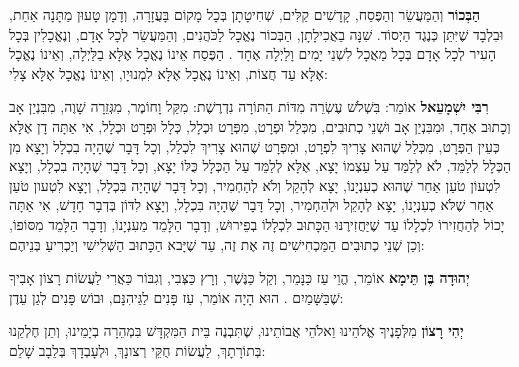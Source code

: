 \textbf{הַבְּכוֹר} וְהַמַּעֲשֵׂר וְהַפֶּסַח, קָדָשִׁים קַלִּים, שְׁחִיטָתָן בְּכָל מָקוֹם בָּעֲזָרָה, וְדָמָן טָעוּן מַתָּנָה אַחַת, וּבִלְבָד שֶׁיִּתֵּן כְּנֶגֶד הַיְסוֹד. שִׁנָּה בַאֲכִילָתָן, הַבְּכוֹר נֶאֱכָל לַכֹּהֲנִים, וְהַמַּעֲשֵׂר לְכָל אָדָם, וְנֶאֱכָלִין בְּכָל הָעִיר לְכָל אָדָם בְּכָל מַאֲכָל לִשְׁנֵי יָמִים וָלַיְלָה אֶחָד . הַפֶּסַח אֵינוֹ נֶאֱכָל אֶלָּא בַלַּיְלָה, וְאֵינוֹ נֶאֱכָל אֶלָּא עַד חֲצוֹת, וְאֵינוֹ נֶאֱכָל אֶלָּא לִמְנוּיָו, וְאֵינוֹ נֶאֱכָל אֶלָּא צָלִי:

\textbf{רִבִּי יִשְׁמָעֵאל} אוֹמֵר: בִּשְׁלשׁ עֶשְׂרֵה מִדּוֹת הַתּוֹרָה נִדְרֶשֶׁת: מִקַּל וָחוֹמֶר, מִגְּזֵרָה שָׁוֶה, מִבִּנְיַן אָב וְכָתוּב אֶחָד, וּמִבִּנְיַן אָב וּשְׁנֵי כְתוּבִים, מִכְּלַל וּפְרָט, מִפְּרָט וּכְלָל, כְּלָל וּפְרָט וּכְלָל, אִי אַתָּה דָן אֶלָּא כְּעֵין הַפְּרָט, מִכְּלַל שֶׁהוּא צָרִיךְ לִפְרָט, וּמִפְּרָט שֶׁהוּא צָרִיךְ לִכְלַל, וְכָל דָּבָר שֶׁהָיָה בִכְלָל וְיָצָא מִן הַכְּלָל לְלַמֵּד, לֹא לְלַמֵּד עַל עַצְמוֹ יָצָא, אֶלָּא לְלַמֵּד עַל הַכְּלָל כֻּלּוֹ יָצָא, וְכָל דָּבָר שֶׁהָיָה בִכְלָל, וְיָצָא לִטְעוֹן טֹעַן אַחַר שֶׁהוּא כְעִנְיָנוֹ, יָצָא לְהָקֵל וְלֹא לְהַחְמִיר, וְכָל דָּבָר שֶׁהָיָה בִּכְלָל, וְיָצָא לִטְעון טֹעַן אַחַר שֶׁלֹּא כְעִנְיָנוֹ, יָצָא לְהָקֵל וּלְהַחְמִיר, וְכָל דָּבָר שֶׁהָיָה בִּכְלָל, וְיָצָא לִדּוֹן בְּדְבָר חָדָשׁ, אִי אַתָּה יָכוֹל לְהַחֲזִירוֹ לִכְלָלוֹ עַד שֶׁיַּחֲזִירֶנּוּ הַכָּתוּב לִכְלָלוֹ בְפֵירוּשׁ, וְדָבָר הַלָּמֵד מֵעִנְיָנוֹ, וְדָבָר הַלָּמֵד מִסּוֹפוֹ, וְכַן שְׁנֵי כְתוּבִים הַמַּכְחִישִׁים זֶה אֶת זֶה, עַד שֶׁיָּבא הַכָּתוּב הַשְּׁלִישִׁי וְיַכְרִיעַ בְּנֵיהֶם:

\textbf{יְהוּדָה בֶּן תֵּימָא} אוֹמֵר, הֱוֵי עַז כַּנָּמֵר, וְקַל כַּנֶּשֶׁר, וְרָץ כַּצְּבִי, וְגִבּוֹר כַּאֲרִי לַעֲשׂוֹת רָצוֹן אָבִיךָ שֶׁבַּשָּׁמַיִם . הוּא הָיָה אוֹמֵר, עַז פָּנִים לַגֵּיהִנָּם, וּבוֹש פָּנִים לְגַן עֵדֶן:

\textbf{יְהִי רָצוֹן} מִלְּפָנֶיךָ \Shem{} אֱלֹהֵינוּ וֵאלֹהֵי אֲבוֹתֵינוּ, שֶׁתִּבְנֶה בֵּית הַמִּקְדָּשׁ בִּמְהֵרָה בְיָמֵינוּ, וְתֵן חֶלְקֵנוּ בְּתוֹרָתָךְ, לַעֲשׂוֹת חֻקֵּי רְצונָךְ, וּלְעָבְדָךְ בְּלֵבָב שָׁלֵם:


